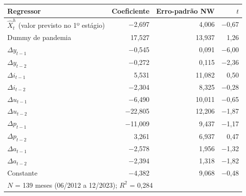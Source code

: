 \begin{tabular}{lrrr}
\toprule
Regressor & Coeficiente & Erro-padrão NW & $t$ \\
\midrule
$\widehat{X}^h_t$ (valor previsto no 1º estágio) & \ensuremath{-}2{,}697 & 4{,}006 & \ensuremath{-}0{,}67 \\
Dummy de pandemia & 17{,}527 & 13{,}937 & 1{,}26 \\
$\Delta y_{t-1}$ & \ensuremath{-}0{,}545 & 0{,}091 & \ensuremath{-}6{,}00 \\
$\Delta y_{t-2}$ & \ensuremath{-}0{,}272 & 0{,}115 & \ensuremath{-}2{,}36 \\
$\Delta i_{t-1}$ & 5{,}531 & 11{,}082 & 0{,}50 \\
$\Delta i_{t-2}$ & \ensuremath{-}2{,}304 & 8{,}325 & \ensuremath{-}0{,}28 \\
$\Delta u_{t-1}$ & \ensuremath{-}6{,}490 & 10{,}011 & \ensuremath{-}0{,}65 \\
$\Delta u_{t-2}$ & \ensuremath{-}22{,}805 & 12{,}206 & \ensuremath{-}1{,}87 \\
$\Delta p_{t-1}$ & \ensuremath{-}11{,}009 & 9{,}437 & \ensuremath{-}1{,}17 \\
$\Delta p_{t-2}$ & 3{,}261 & 6{,}937 & 0{,}47 \\
$\Delta a_{t-1}$ & \ensuremath{-}2{,}578 & 1{,}956 & \ensuremath{-}1{,}32 \\
$\Delta a_{t-2}$ & \ensuremath{-}2{,}394 & 1{,}318 & \ensuremath{-}1{,}82 \\
Constante & \ensuremath{-}4{,}382 & 9{,}068 & \ensuremath{-}0{,}48 \\
\midrule
\multicolumn{4}{l}{$N$ = 139 meses (06/2012 a 12/2023); $R^2$ = 0{,}284} \\
\bottomrule
\end{tabular}

